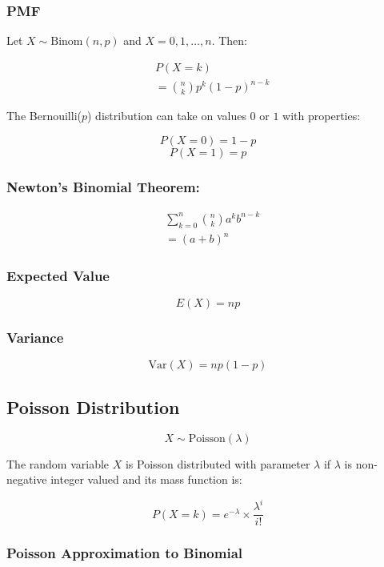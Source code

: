 \subsubsection*{PMF}

Let $X \sim \text{Binom}(n,p)$ and $X = 0,1,\dots,n$. Then:

\begin{align*}
     & P(X = k)                       \\
     & = \binom{n}{k} p^k (1-p)^{n-k}
\end{align*}

The Bernouilli($p$) distribution can take on values $0$ or $1$ with properties:

$$ P(X = 0) = 1 - p $$
$$ P(X = 1) = p $$

\subsubsection*{Newton's Binomial Theorem:}

\begin{align*}
     & \sum_{k=0}^n \binom{n}{k} a^k b^{n-k} \\
     & =(a + b)^n
\end{align*}

\subsubsection*{Expected Value}

$$ E(X) = np $$

\subsubsection*{Variance}

$$ \text{Var}(X) = np(1-p) $$

\subsection*{Poisson Distribution}

$$ X \sim \text{Poisson}(\lambda) $$

The random variable $X$ is Poisson distributed with parameter $\lambda$ if $\lambda$ is non-negative integer valued and its mass function is:

$$ P(X = k) = e^{-\lambda} \times \frac{\lambda^i}{i!} $$

\subsubsection*{Poisson Approximation to Binomial}


